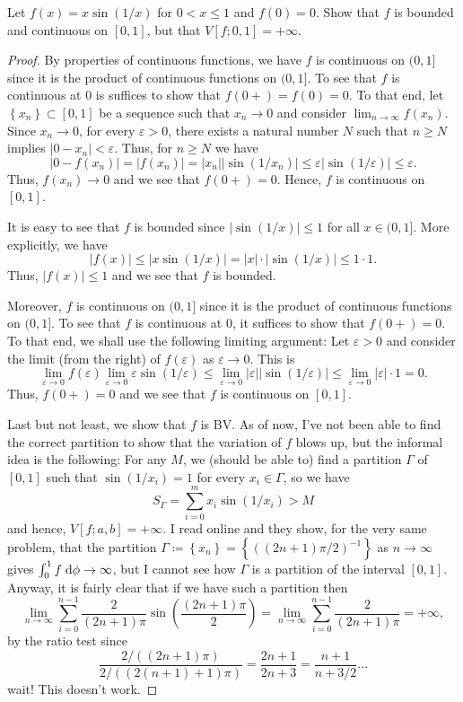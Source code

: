 \begin{problem}
Let $f(x)=x\sin(1/x)$ for $0<x\leq 1$ and $f(0)=0$. Show that $f$ is
bounded and continuous on $[0,1]$, but that $V[f;0,1]=+\infty$.
\end{problem}
\begin{proof}
By properties of continuous functions, we have $f$ is continuous on $(0,1]$
since it is the product of continuous functions on $(0,1]$. To see that $f$
is continuous at $0$ is suffices to show that $f(0+)=f(0)=0$. To that end,
let $\left\{x_n\right\}\subset[0,1]$ be a sequence such that $x_n\to 0$ and
consider $\lim_{n\to\infty} f\left(x_n\right)$. Since $x_n\to 0$, for every
$\varepsilon>0$, there exists a natural number $N$ such that $n\geq N$
implies $|0-x_n|<\varepsilon$. Thus, for $n\geq N$ we have
\[
\left|0-f(x_n)\right|=\left|f(x_n)\right|=
\left|x_n\right|\left|\sin(1/x_n)\right|\leq
\varepsilon\left|\sin(1/\varepsilon)\right|\leq
\varepsilon.
\]
Thus, $f(x_n)\to 0$ and we see that $f(0+)=0$. Hence, $f$ is continuous on
$[0,1]$.


It is easy to see that $f$ is bounded since $|\sin(1/x)|\leq 1$ for all
$x\in(0,1]$. More explicitly, we have
\[
|f(x)|\leq |x\sin(1/x)|=|x|\cdot|\sin(1/x)|\leq 1\cdot 1.
\]
Thus, $|f(x)|\leq 1$ and we see that $f$ is bounded.

Moreover, $f$ is continuous on $(0,1]$ since it is the product of
continuous functions on $(0,1]$. To see that $f$ is continuous at $0$, it
suffices to show that $f(0+)=0$. To that end, we shall use the following
limiting argument: Let $\varepsilon>0$ and consider the limit (from the
right) of $f(\varepsilon)$ as $\varepsilon\to 0$. This is
\[
\lim_{\varepsilon\to 0}f(\varepsilon)
\lim_{\varepsilon\to 0}\varepsilon\sin(1/\varepsilon)\leq
\lim_{\varepsilon\to 0}\left|\varepsilon\right|\left|\sin(1/\varepsilon)\right|
\leq\lim_{\varepsilon\to 0}\left|\varepsilon\right|\cdot 1=0.
\]
Thus, $f(0+)=0$ and we see that $f$ is continuous on $[0,1]$.

Last but not least, we show that $f$ is BV. As of now, I've not been able
to find the correct partition to show that the variation of $f$ blows up,
but the informal idea is the following: For any $M$, we (should be able to)
find a partition $\Gamma$ of $[0,1]$ such that $\sin(1/x_i)=1$ for every
$x_i\in\Gamma$, so we have
\[
S_\Gamma=\sum_{i=0}^m x_i\sin(1/x_i)>M
\]
and hence, $V[f;a,b]=+\infty$. I read online and they show, for the very
same problem, that the partition
$\Gamma\coloneqq\left\{x_n\right\}=\left\{((2n+1)\pi/2)^{-1}\right\}$ as
$n\to\infty$ gives $\int_0^1f\;\mathrm{d}\phi\to\infty$, but I cannot see how
$\Gamma$ is a partition of the interval $[0,1]$. Anyway, it is fairly clear
that if we have such a partition then
\[
\lim_{n\to\infty}\sum_{i=0}^{n-1}\frac{2}{(2n+1)\pi}
\sin\left(\frac{(2n+1)\pi}{2}\right)=
\lim_{n\to\infty}\sum_{i=0}^{n-1}\frac{2}{(2n+1)\pi}=+\infty,
\]
by the ratio test since
\[
\frac{2/((2n+1)\pi)}{2/((2(n+1)+1)\pi)}=\frac{2n+1}{2n+3}=\frac{n+1}{n+3/2}...
\]
wait! This doesn't work.
\end{proof}
\newpage

